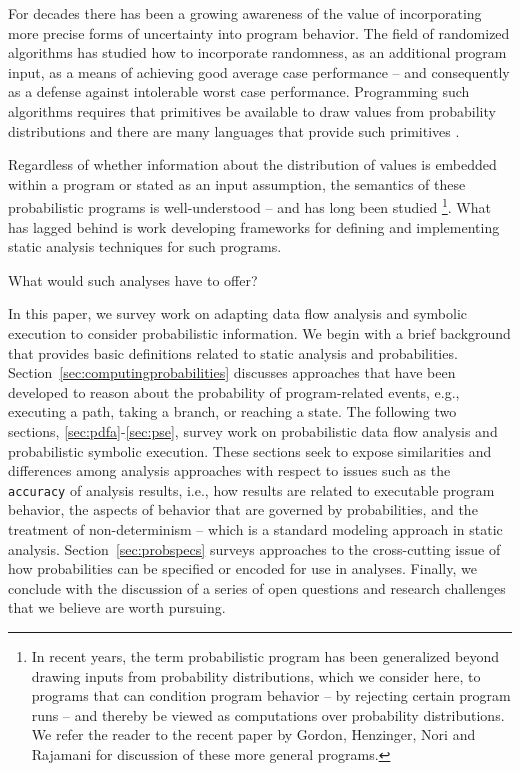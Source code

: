 For decades there has been a growing awareness of the value of 
incorporating more precise forms of uncertainty into program behavior.  
The field of randomized algorithms has studied how to incorporate
randomness, as an additional program input, as a means of achieving
good average case performance -- and consequently as a defense against
intolerable worst case performance.
Programming such algorithms requires that primitives be available
to draw values from probability distributions and there are many
languages that provide such primitives \cite{tisue2004netlogo,others}.  

Regardless of whether information about the distribution of
values is embedded within a program or stated as an input assumption,
the semantics of these probabilistic programs is well-understood --
and has long been studied 
\cite{kozen1981semantics,kozen1983probabilistic,jones1990probabilistic,morgan1996probabilistic}
\footnote{In recent
years, the term probabilistic program has been generalized beyond
drawing inputs from probability distributions, which we
consider here, to programs that can condition program behavior -- by
rejecting certain program runs -- and thereby be viewed as
computations over probability distributions.  We refer the reader to the
recent paper by Gordon, Henzinger, Nori and Rajamani \cite{Gordon2014}
for discussion of these more general programs.}. 
What has lagged behind is work developing frameworks for 
defining and implementing static analysis techniques for such programs.

What would such analyses have to offer?

In this paper, we survey work on adapting data flow analysis 
and symbolic execution to consider probabilistic information.
We begin with a brief background that provides basic definitions
related to static analysis and probabilities.
Section~\ref{sec:computingprobabilities} discusses approaches that
have been developed to reason about the probability of program-related 
events, e.g., executing a path, taking a branch, or reaching a state.
The following two sections, \ref{sec:pdfa}-\ref{sec:pse}, 
survey work on probabilistic data flow analysis and probabilistic
symbolic execution.  These sections seek to expose similarities
and differences among analysis approaches with respect to issues
such as the \texttt{accuracy} of analysis results, i.e., how results
are related to executable program behavior, 
the aspects of behavior that are governed by probabilities, and
the treatment of non-determinism -- which is a standard modeling
approach in static analysis.
Section~\ref{sec:probspecs} surveys approaches to the cross-cutting
issue of how probabilities can be specified or encoded for use
in analyses.
Finally, we conclude with the discussion of a series of open questions
and research challenges that we believe are worth pursuing.

